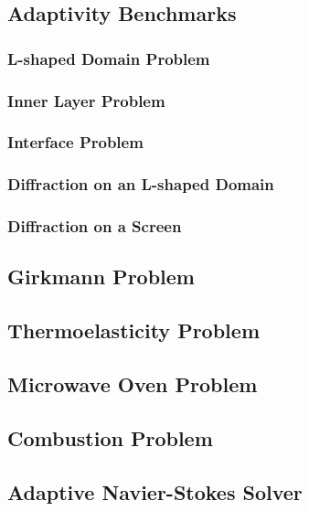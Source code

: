 


\subsection{Adaptivity Benchmarks}

\subsubsection{L-shaped Domain Problem}

\subsubsection{Inner Layer Problem}

\subsubsection{Interface Problem}


\subsubsection{Diffraction on an L-shaped Domain}

\subsubsection{Diffraction on a Screen}



\subsection{Girkmann Problem}


\subsection{Thermoelasticity Problem}


\subsection{Microwave Oven Problem}


\subsection{Combustion Problem}


\subsection{Adaptive Navier-Stokes Solver}

